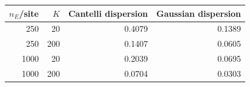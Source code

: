 \begin{center}
\begin{tabular}{rrrr}
\toprule
$n_E$/site & $K$ & Cantelli dispersion & Gaussian dispersion\\
\midrule
250 & 20 & 0.4079 & 0.1389\\
250 & 200 & 0.1407 & 0.0605\\
1000 & 20 & 0.2039 & 0.0695\\
1000 & 200 & 0.0704 & 0.0303\\
\bottomrule
\end{tabular}
\end{center}
